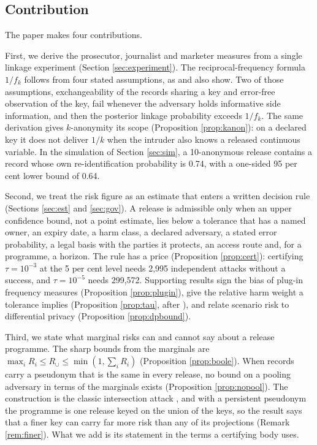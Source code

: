 \documentclass[11pt,a4paper]{article}
\theoremstyle{plain}
\theoremstyle{definition}
\theoremstyle{definition}
\theoremstyle{plain}
\begin{document}
\subsection{Contribution}

The paper makes four contributions.

First, we derive the prosecutor, journalist and marketer measures from a single
linkage experiment (Section \ref{sec:experiment}). The reciprocal-frequency
formula $1/f_k$ follows from four stated assumptions, as
\citet{duncan1989} and \citet{skinner2002} also show. Two of
those assumptions, exchangeability of the records sharing a key and error-free
observation of the key, fail whenever the adversary holds informative side
information, and then the posterior linkage probability exceeds $1/f_k$. The
same derivation gives $k$-anonymity its scope (Proposition \ref{prop:kanon}): on
a declared key it does not deliver $1/k$ when the intruder also knows a released
continuous variable. In the simulation of Section \ref{sec:sim}, a
10-anonymous release contains a record whose own re-identification probability
is 0.74, with a one-sided 95 per cent lower bound of 0.64.

Second, we treat the risk figure as an estimate that enters a written decision
rule (Sections \ref{sec:est} and \ref{sec:gov}). A release is admissible only
when an upper confidence bound, not a point estimate, lies below a tolerance
that has a named owner, an expiry date, a harm class, a declared adversary, a
stated error probability, a legal basis with the parties it protects, an access
route and, for a programme, a horizon. The rule has a price
(Proposition \ref{prop:cert}): certifying $\tau = 10^{-3}$ at the 5 per cent
level needs 2,995 independent attacks without a success, and $\tau = 10^{-5}$
needs 299,572. Supporting results sign the bias of plug-in frequency measures
(Proposition \ref{prop:plugin}), give the relative harm weight a tolerance
implies (Proposition \ref{prop:tau}, after \citet{abowd2019}), and relate
scenario risk to differential privacy (Proposition \ref{prop:dpbound}).

Third, we state what marginal risks can and cannot say about a release
programme. The sharp bounds from the marginals are $\max_i R_i \leq R_\cup \leq
\min(1, \sum_i R_i)$ (Proposition \ref{prop:boole}). When records carry a
pseudonym that is the same in every release, no bound on a pooling adversary in
terms of the marginals exists (Proposition \ref{prop:nopool}). The construction
is the classic intersection attack \citep{sweeney2002,ganta2008}, and with a
persistent pseudonym the programme is one release keyed on the union of the
keys, so the result says that a finer key can carry far more risk than any of
its projections (Remark \ref{rem:finer}). What we add is its statement in the
terms a certifying body uses.
\end{document}
